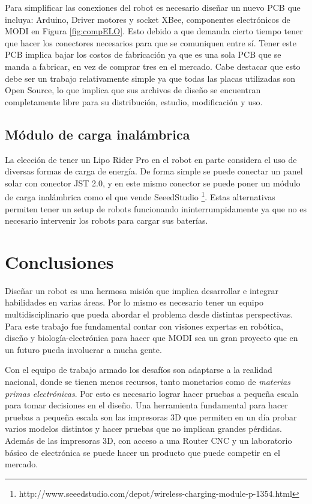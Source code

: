 Para simplificar las conexiones del robot es necesario diseñar un nuevo PCB que incluya: Arduino, Driver motores y socket XBee, componentes electrónicos de MODI en Figura \ref{fig:compELO}. Esto debido a que demanda cierto tiempo tener que hacer los conectores necesarios para que se comuniquen entre sí. Tener este PCB implica bajar los costos de fabricación ya que es una sola PCB que se manda a fabricar, en vez de comprar tres en el mercado. Cabe destacar que esto debe ser un trabajo relativamente simple ya que todas las placas utilizadas son Open Source, lo que implica que sus archivos de diseño se encuentran completamente libre para su distribución, estudio, modificación y uso.



\subsection{Módulo de carga inalámbrica}
La elección de tener un Lipo Rider Pro en el robot en parte considera el uso de diversas formas de carga de energía. De forma simple se puede conectar un panel solar con conector JST 2.0, y en este mismo conector se puede poner un módulo de carga inalámbrica como el que vende SeeedStudio \footnote{http://www.seeedstudio.com/depot/wireless-charging-module-p-1354.html}. Estas alternativas permiten tener un setup de robots funcionando ininterrumpidamente ya que no es necesario intervenir los robots para cargar sus baterías. 



\section{Conclusiones}
Diseñar un robot es una hermosa misión que implica desarrollar e integrar habilidades en varias áreas. Por lo mismo es necesario tener un equipo multidisciplinario que pueda abordar el problema desde distintas perspectivas. Para este trabajo fue fundamental contar con visiones expertas en robótica, diseño y biología-electrónica para hacer que MODI sea un gran proyecto que en un futuro pueda involucrar a mucha gente.

Con el equipo de trabajo armado los desafíos son adaptarse a la realidad nacional, donde se tienen menos recursos, tanto monetarios como de \textit{materias primas electrónicas}. Por esto es necesario lograr  hacer pruebas a pequeña escala para tomar decisiones en el diseño. Una herramienta fundamental para hacer pruebas a pequeña escala son las impresoras 3D que permiten en un día probar varios modelos distintos y hacer pruebas que no implican grandes pérdidas. Además de las impresoras 3D, con acceso a una Router CNC y un laboratorio básico de electrónica se puede hacer un producto que puede competir en el mercado.

